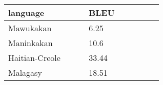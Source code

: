 \begin{tabular}{p{0.3\linewidth}p{0.3\linewidth}}
	\toprule
	language & BLEU \\
	\toprule
	Mawukakan & 6.25 \\
	Maninkakan & 10.6 \\
	Haitian-Creole & 33.44 \\
	Malagasy & 18.51 \\
	\bottomrule
\end{tabular}